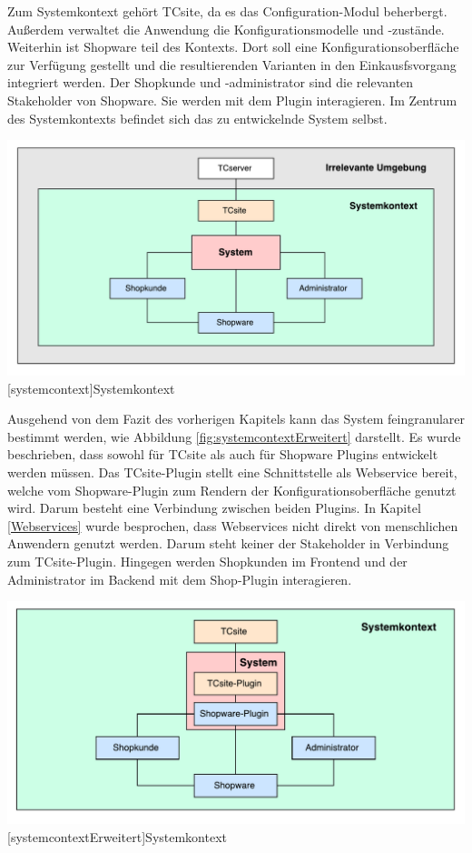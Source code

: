 \documentclass[11pt, a4paper, titlepage, listof=totoc, bibliography=totoc, index=totoc, twoside, openright, headings=normal, draft]{scrreprt}
\begin{document}
Zum Systemkontext gehört TCsite, da es das Configuration-Modul beherbergt. Außerdem verwaltet die Anwendung die Konfigurationsmodelle und -zustände. Weiterhin ist Shopware teil des Kontexts. Dort soll eine Konfigurationsoberfläche zur Verfügung gestellt und die resultierenden Varianten in den Einkausfsvorgang integriert werden. Der Shopkunde und -administrator sind die relevanten Stakeholder von Shopware. Sie werden mit dem Plugin interagieren.
Im Zentrum des Systemkontexts befindet sich das zu entwickelnde System selbst.

\vspace{1em}
\begin{minipage}{\linewidth}
	\centering
	\includegraphics[width=0.8\linewidth]{Abbildungen/systemcontext.pdf}
	[systemcontext]{Systemkontext}
	\label{fig:systemcontext}
\end{minipage}
\vspace{1em}

Ausgehend von dem Fazit des vorherigen Kapitels kann das System feingranularer bestimmt werden, wie Abbildung \ref{fig:systemcontextErweitert} darstellt. Es wurde beschrieben, dass sowohl für TCsite als auch für Shopware Plugins entwickelt werden müssen. Das TCsite-Plugin stellt eine Schnittstelle als Webservice bereit, welche vom Shopware-Plugin zum Rendern der Konfigurationsoberfläche genutzt wird. Darum besteht eine Verbindung zwischen beiden Plugins.
In Kapitel \ref{Webservices} wurde besprochen, dass Webservices nicht direkt von menschlichen Anwendern genutzt werden. Darum steht keiner der Stakeholder in Verbindung zum TCsite-Plugin. Hingegen werden Shopkunden im Frontend und der Administrator im Backend mit dem Shop-Plugin interagieren.

\vspace{1em}
\begin{minipage}{\linewidth}
	\centering
	\includegraphics[width=0.8\linewidth]{Abbildungen/systemcontextErweitert.pdf}
	[systemcontextErweitert]{Systemkontext}
	\label{fig:systemcontextErweitert}
\end{minipage}
\vspace{1em}
\end{document}
